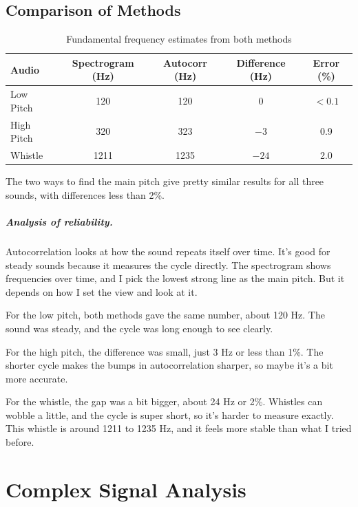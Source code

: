 \documentclass[11pt,a4paper]{report}
\begin{document}
\section*{Comparison of Methods}

\begin{table}[H]
  \centering
  \caption{Fundamental frequency estimates from both methods}
  \begin{tabular}{lcccc}
    \toprule
    Audio       & Spectrogram (Hz) & Autocorr (Hz) & Difference (Hz) & Error (\%)\\
    \midrule
    Low Pitch   & 120              & 120           & 0               & $<0.1$\\
    High Pitch  & 320              & 323           & $-3$            & 0.9\\
    Whistle     & 1211             & 1235          & $-24$           & 2.0 \\
    \bottomrule
  \end{tabular}
\end{table}

The two ways to find the main pitch give pretty similar results for all three sounds, with differences less than 2\%.

\paragraph{Analysis of reliability.}
Autocorrelation looks at how the sound repeats itself over time. It's good for steady sounds because it measures the cycle directly. The spectrogram shows frequencies over time, and I pick the lowest strong line as the main pitch. But it depends on how I set the view and look at it.

For the low pitch, both methods gave the same number, about 120 Hz. The sound was steady, and the cycle was long enough to see clearly.

For the high pitch, the difference was small, just 3 Hz or less than 1\%. The shorter cycle makes the bumps in autocorrelation sharper, so maybe it's a bit more accurate.

For the whistle, the gap was a bit bigger, about 24 Hz or 2\%. Whistles can wobble a little, and the cycle is super short, so it's harder to measure exactly. This whistle is around 1211 to 1235 Hz, and it feels more stable than what I tried before.

\chapter*{Complex Signal Analysis}
\end{document}
